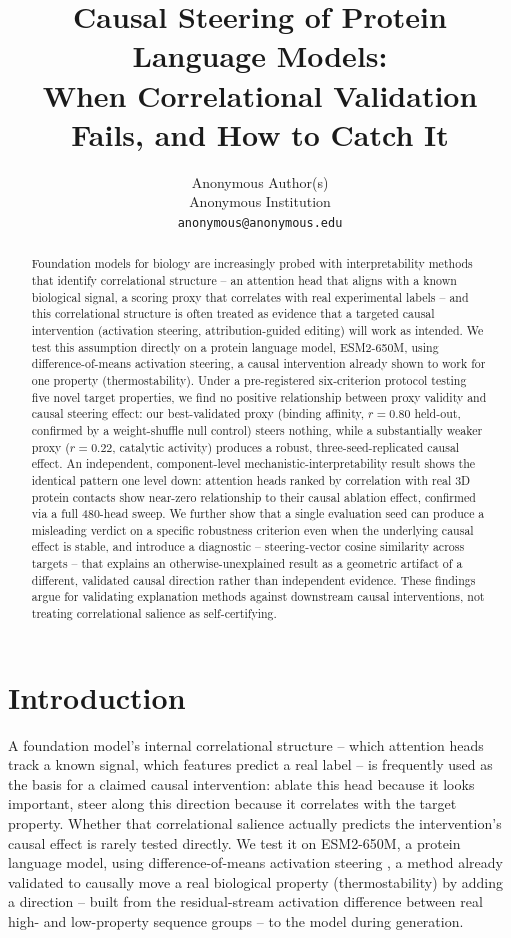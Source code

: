 \documentclass{article}
\title{Causal Steering of Protein Language Models: \\
When Correlational Validation Fails, and How to Catch It}
\author{%
  Anonymous Author(s) \\
  Anonymous Institution \\
  \texttt{anonymous@anonymous.edu}
}
\begin{document}
\maketitle

\begin{abstract}
Foundation models for biology are increasingly probed with interpretability
methods that identify correlational structure -- an attention head that
aligns with a known biological signal, a scoring proxy that correlates
with real experimental labels -- and this correlational structure is
often treated as evidence that a targeted causal intervention (activation
steering, attribution-guided editing) will work as intended. We test this
assumption directly on a protein language model, ESM2-650M, using
difference-of-means activation steering, a causal intervention already
shown to work for one property (thermostability). Under a pre-registered
six-criterion protocol testing five novel target properties, we find no
positive relationship between proxy validity and causal steering effect:
our best-validated proxy (binding affinity, $r=0.80$ held-out, confirmed
by a weight-shuffle null control) steers nothing, while a substantially
weaker proxy ($r=0.22$, catalytic activity) produces a robust,
three-seed-replicated causal effect. An independent, component-level
mechanistic-interpretability result shows the identical pattern one level
down: attention heads ranked by correlation with real 3D protein contacts
show near-zero relationship to their causal ablation effect, confirmed
via a full 480-head sweep. We further show that a single evaluation seed
can produce a misleading verdict on a specific robustness criterion even
when the underlying causal effect is stable, and introduce a diagnostic
-- steering-vector cosine similarity across targets -- that explains an
otherwise-unexplained result as a geometric artifact of a different,
validated causal direction rather than independent evidence. These
findings argue for validating explanation methods against downstream
causal interventions, not treating correlational salience as
self-certifying.
\end{abstract}

\section{Introduction}

A foundation model's internal correlational structure -- which attention
heads track a known signal, which features predict a real label -- is
frequently used as the basis for a claimed causal intervention: ablate
this head because it looks important, steer along this direction because
it correlates with the target property. Whether that correlational
salience actually predicts the intervention's causal effect is rarely
tested directly. We test it on ESM2-650M, a protein language model, using
difference-of-means activation steering \citep{huang2025steering}, a
method already validated to causally move a real biological property
(thermostability) by adding a direction -- built from the residual-stream
activation difference between real high- and low-property sequence
groups -- to the model during generation.
\end{document}

